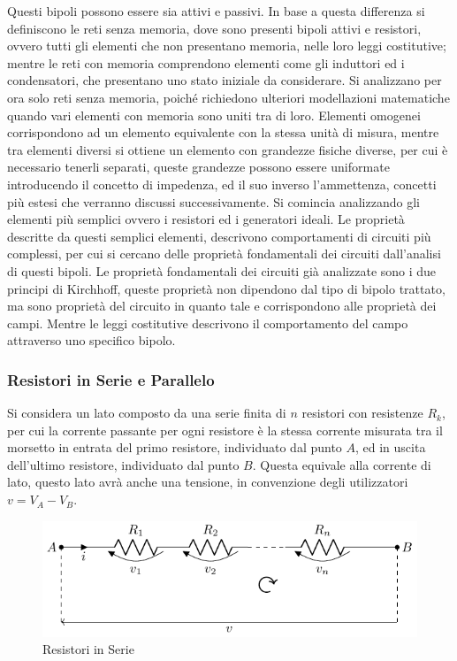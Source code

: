 \documentclass{article}
\numberwithin{equation}{subsection}
\begin{document}
Questi bipoli possono essere sia attivi e passivi. In base a questa differenza si definiscono le reti senza memoria, dove sono presenti bipoli attivi e resistori, ovvero tutti 
gli elementi che non presentano memoria, nelle loro leggi costitutive; mentre le reti con memoria comprendono elementi come gli induttori ed i condensatori, che presentano 
uno stato iniziale da considerare. Si analizzano per ora solo reti senza memoria, poiché richiedono ulteriori modellazioni matematiche 
quando vari elementi con memoria sono uniti tra di loro. Elementi omogenei corrispondono ad un elemento equivalente con la stessa unità di misura, mentre tra elementi diversi 
si ottiene un elemento con grandezze fisiche diverse, per cui è necessario tenerli separati, queste grandezze possono essere uniformate introducendo il concetto di impedenza, 
ed il suo inverso l'ammettenza, concetti più estesi che verranno discussi successivamente. Si comincia analizzando gli elementi più semplici ovvero i resistori ed i generatori 
ideali. Le proprietà descritte da questi semplici elementi, descrivono comportamenti di circuiti più complessi, per cui si cercano delle proprietà fondamentali dei circuiti 
dall'analisi di questi bipoli. Le proprietà fondamentali dei circuiti già analizzate sono i due principi di Kirchhoff, queste proprietà non dipendono dal tipo di bipolo trattato, 
ma sono proprietà del circuito in quanto tale e corrispondono alle proprietà dei campi. Mentre le leggi costitutive descrivono il comportamento del campo attraverso uno 
specifico bipolo.   

\subsubsection{Resistori in Serie e Parallelo}

Si considera un lato composto da una serie finita di $n$ resistori con resistenze $R_k$, per cui la corrente passante per ogni resistore è la stessa corrente misurata tra il 
morsetto in entrata del primo resistore, individuato dal punto $A$, ed in uscita dell'ultimo resistore, individuato dal punto $B$. Questa equivale alla corrente di lato, 
questo lato avrà anche una tensione, in convenzione degli utilizzatori $v=V_A-V_B$. 
\begin{figure}[H]%
    \centering
    \includegraphics{resistori-serie.pdf}
    \caption{Resistori in Serie}
    \label{fig:resistori-serie}
\end{figure}
\end{document}
